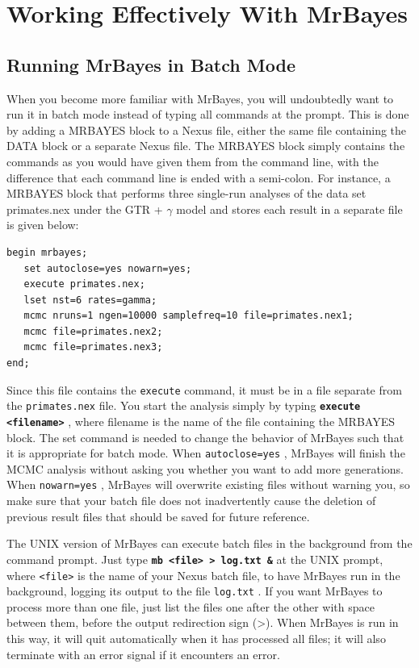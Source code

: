 \documentclass[12pt]{book}
\newcommand{\ttt}[1]{\texttt{#1} }
\newcommand{\tb}[1]{\ttt{\textbf{#1}} }
\begin{document}
\section{Working Effectively With MrBayes}

\subsection{Running MrBayes in Batch Mode}

When you become more familiar with MrBayes, you will undoubtedly want to run it in batch mode
instead of typing all commands at the prompt. This is done by adding a MRBAYES block to a Nexus
file, either the same file containing the DATA block or a separate Nexus file. The MRBAYES block
simply contains the commands as you would have given them from the command line, with the
difference that each command line is ended with a semi-colon. For instance, a MRBAYES block that
performs three single-run analyses of the data set primates.nex under the GTR + $\gamma$  model and
stores each result in a separate file is given below:

\begin{singlespacing}
\small
\begin{verbatim}
begin mrbayes;
   set autoclose=yes nowarn=yes;
   execute primates.nex;
   lset nst=6 rates=gamma;
   mcmc nruns=1 ngen=10000 samplefreq=10 file=primates.nex1;
   mcmc file=primates.nex2;
   mcmc file=primates.nex3;
end;
\end{verbatim}
\normalsize
\end{singlespacing}

Since this file contains the \ttt{execute} command, it must be in a file separate from the
\ttt{primates.nex} file. You start the analysis simply by typing \tb{execute <filename>}, where
filename is the name of the file containing the MRBAYES block.  The set command is needed to change
the behavior of MrBayes such that it is appropriate for batch mode. When \ttt{autoclose=yes},
MrBayes will finish the MCMC analysis without asking you whether you want to add more generations.
When \ttt{nowarn=yes}, MrBayes will overwrite existing files without warning you, so make sure
that your batch file does not inadvertently cause the deletion of previous result files that should
be saved for future reference.

The UNIX version of MrBayes can execute batch files in the background from the command prompt. Just
type \tb{mb <file> > log.txt \&} at the UNIX prompt, where \ttt{<file>} is the name of your Nexus
batch file, to have MrBayes run in the background, logging its output to the file \ttt{log.txt}. If
you want MrBayes to process more than one file, just list the files one after the other with space
between them, before the output redirection sign (>). When MrBayes is run in this way, it will quit
automatically when it has processed all files; it will also terminate with an error signal if it
encounters an error.
\end{document}
